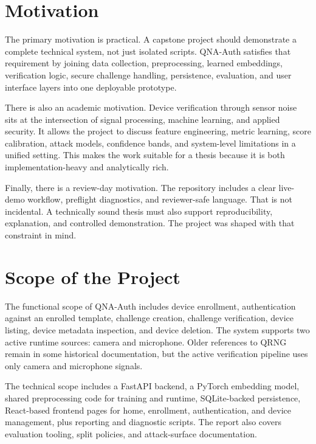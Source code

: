 \documentclass[12pt]{report}
\begin{document}
\section{Motivation}
The primary motivation is practical. A capstone project should demonstrate a complete technical system, not just isolated scripts. QNA-Auth satisfies that requirement by joining data collection, preprocessing, learned embeddings, verification logic, secure challenge handling, persistence, evaluation, and user interface layers into one deployable prototype.

There is also an academic motivation. Device verification through sensor noise sits at the intersection of signal processing, machine learning, and applied security. It allows the project to discuss feature engineering, metric learning, score calibration, attack models, confidence bands, and system-level limitations in a unified setting. This makes the work suitable for a thesis because it is both implementation-heavy and analytically rich.

Finally, there is a review-day motivation. The repository includes a clear live-demo workflow, preflight diagnostics, and reviewer-safe language. That is not incidental. A technically sound thesis must also support reproducibility, explanation, and controlled demonstration. The project was shaped with that constraint in mind.

\section{Scope of the Project}
The functional scope of QNA-Auth includes device enrollment, authentication against an enrolled template, challenge creation, challenge verification, device listing, device metadata inspection, and device deletion. The system supports two active runtime sources: camera and microphone. Older references to QRNG remain in some historical documentation, but the active verification pipeline uses only camera and microphone signals.

The technical scope includes a FastAPI backend, a PyTorch embedding model, shared preprocessing code for training and runtime, SQLite-backed persistence, React-based frontend pages for home, enrollment, authentication, and device management, plus reporting and diagnostic scripts. The report also covers evaluation tooling, split policies, and attack-surface documentation.
\end{document}
